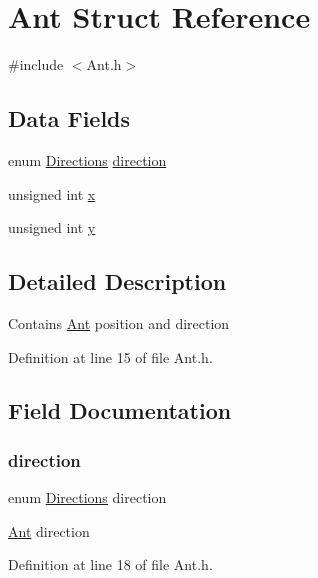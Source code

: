 \hypertarget{struct_ant}{}\section{Ant Struct Reference}
\label{struct_ant}


{\ttfamily \#include $<$Ant.\+h$>$}

\subsection*{Data Fields}
\begin{DoxyCompactItemize}
\item 
enum \mbox{\hyperlink{_ant_8h_a04f362029ec2a624fbcb7a30b20ff5f5}{Directions}} \mbox{\hyperlink{struct_ant_a1ade16a03ccf7587a43b9f384bb4451c}{direction}}
\item 
unsigned int \mbox{\hyperlink{struct_ant_a676e0da0ef83bbbdf42538e54b97506b}{x}}
\item 
unsigned int \mbox{\hyperlink{struct_ant_ac30de26db5f6d1c18c63913729adca7d}{y}}
\end{DoxyCompactItemize}


\subsection{Detailed Description}
Contains \mbox{\hyperlink{struct_ant}{Ant}} position and direction 

Definition at line 15 of file Ant.\+h.



\subsection{Field Documentation}
\mbox{\label{struct_ant_a1ade16a03ccf7587a43b9f384bb4451c}} 
\subsubsection{\texorpdfstring{direction}{direction}}
{\footnotesize\ttfamily enum \mbox{\hyperlink{_ant_8h_a04f362029ec2a624fbcb7a30b20ff5f5}{Directions}} direction}

\mbox{\hyperlink{struct_ant}{Ant}} direction 

Definition at line 18 of file Ant.\+h.

\mbox{\label{struct_ant_a676e0da0ef83bbbdf42538e54b97506b}} 
